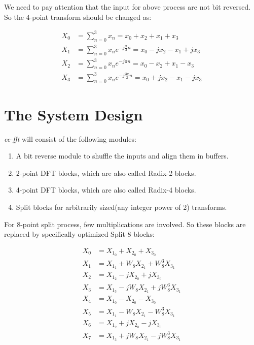 \documentclass[a4paper]{report}
\begin{document}
	We need to pay attention that the input for above process are not bit reversed. So the 4-point transform should be changed as:
	
\begin{align*}
X_0 &= \sum_{n=0}^{3} x_n = x_0 + x_2 + x_1 + x_3 \\
X_1 &= \sum_{n=0}^{3} x_n e^{-j\frac{\pi}{2}n} = x_0 - jx_2 - x_1 + jx_3 \\
X_2 &= \sum_{n=0}^{3} x_n e^{-j\pi n} = x_0 - x_2 + x_1 - x_3 \\
X_3 &= \sum_{n=0}^{3} x_n e^{-j\frac{3\pi}{2} n} = x_0 + jx_2 - x_1 - jx_3
\end{align*}

\section{The System Design} \indent

	\textit{ee-fft} will consist of the following modules:
	
	\begin{enumerate}
		\item A bit reverse module to shuffle the inputs and align them in buffers.
		\item 2-point DFT blocks, which are also called Radix-2 blocks.
		\item 4-point DFT blocks, which are also called Radix-4 blocks.
		\item Split blocks for arbitrarily sized(any integer power of 2) transforms.
	\end{enumerate}
	
	For 8-point split process, few multiplications are involved. So these blocks are replaced by specifically optimized Split-8 blocks:

\[\begin{split}
  X_{0} & = X_{1_0} + X_{2_0} + X_{3_0}\\
  X_{1} & = X_{1_1} + W_8 X_{2_1} + W_8^3 X_{3_1}\\
  X_{2} & = X_{1_2} - jX_{2_0} + j X_{3_0}\\
  X_{3} & = X_{1_3} - jW_8 X_{2_1} + jW_8^3 X_{3_1}\\
  X_{4} & = X_{1_0} - X_{2_0} - X_{3_0}\\
  X_{5} & = X_{1_1} - W_8 X_{2_1} - W_8^3 X_{3_1}\\
  X_{6} & = X_{1_2} + jX_{2_0} - jX_{3_0}\\
  X_{7} & = X_{1_3} + jW_8 X_{2_1} - jW_8^3 X_{3_1}\\
\end{split}\]
\end{document}
